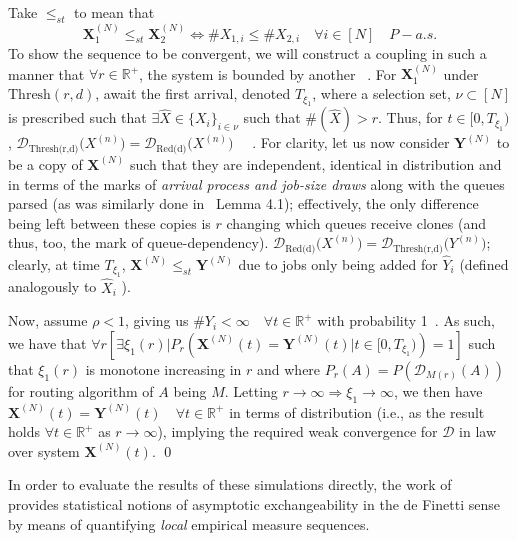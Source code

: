 Take $\leq_{st}$ to mean that~\cite{bramson_asymptotic_2012}
\[\mathbf{X}_{1}^{(N)}\leq_{st}\mathbf{X}_{2}^{(N)} \iff\# X_{1,i} \leq \# X_{2,i}  \quad \forall i \in [N] \quad P-a.s.\]
To show the sequence to be convergent, we will construct a coupling in such a manner that $\forall r \in \mathbb{R}^{+}$,  the system is bounded by another~\cite{baccelli_elements_2003} . For $\mathbf{X}_{1}^{(N)}$ under $\text{Thresh}(r,d)$, await the first arrival, denoted $T_{\xi_{1}}$, where a selection set, $\nu \subset [N] $ is prescribed such that $\exists \hat X \in \{X_{i}\}_{i \in \nu} $ such that $ \# (\hat X) > r $. Thus, for  $ t \in [0,T_{\xi_{1}})$, $\mathcal{D}_{\text{Thresh(r,d)}}\mathbf(X^{(n)}) = \mathcal{D}_{\text{Red(d)}}\mathbf(X^{(n)}) \quad$ . For clarity, let us now consider $\mathbf{Y}^{(N)}$ to be a copy of  $\mathbf{X}^{(N)}$ such that they are independent, identical in distribution and in terms of the marks of \textit{arrival process and job-size draws} along with the queues parsed (as was similarly done in~\cite{bramson_asymptotic_2012} Lemma 4.1); effectively, the only difference being left between these copies is $r$ changing which queues receive clones (and thus, too, the mark of queue-dependency).  $\mathcal{D}_{\text{Red(d)}}\mathbf(X^{(n)}) = \mathcal{D}_{\text{Thresh(r,d)}}\mathbf(Y^{(n)}) $; clearly, at time $T_{\xi_{1}}$, $\mathbf{X}^{(N)}\leq_{st}\mathbf{Y}^{(N)} $
due to jobs only being added for ${\hat Y_{i}}$ (defined analogously to  ${\hat X_{i}}$ ).

Now, assume $\rho< 1$, giving us $ \# Y_{i}  < \infty \quad \forall t \in \mathbb{R}^{+}$ with probability 1~\cite{gardner_redundancy-d_2017}. As such, we have that $\forall r \left[\exists \xi_{1}(r) | P_{r}\left(\mathbf{X}^{(N)} (t) = \mathbf{Y}^{(N)}(t) |t \in [0,T_{\xi_{1}}) \right) = 1\right]$ such that $\xi_{1} (r)$ is monotone increasing in $r$ and where $P_{r}(A) = P(\mathcal{D}_{M(r)}(A))$ for routing algorithm of $A$ being $M$. Letting $r \rightarrow \infty \Rightarrow \xi_{1} \rightarrow \infty$, we then have $\mathbf{X}^{(N)}(t) =  \mathbf{Y}^{(N)}(t) \quad \forall t \in \mathbb{R}^{+}$ in terms of distribution (i.e., as the result holds $\forall t \in \mathbb{R}^{+}$ as $r\rightarrow \infty$), implying the required weak convergence for $\mathcal{D}$ in law over system  $\mathbf{X}^{(N)}(t)$.  \qed

In order to evaluate the results of these simulations directly, the work of~\cite{campbell2020local} provides statistical notions of asymptotic exchangeability in the de Finetti sense by means of quantifying \textit{local} empirical measure sequences.

